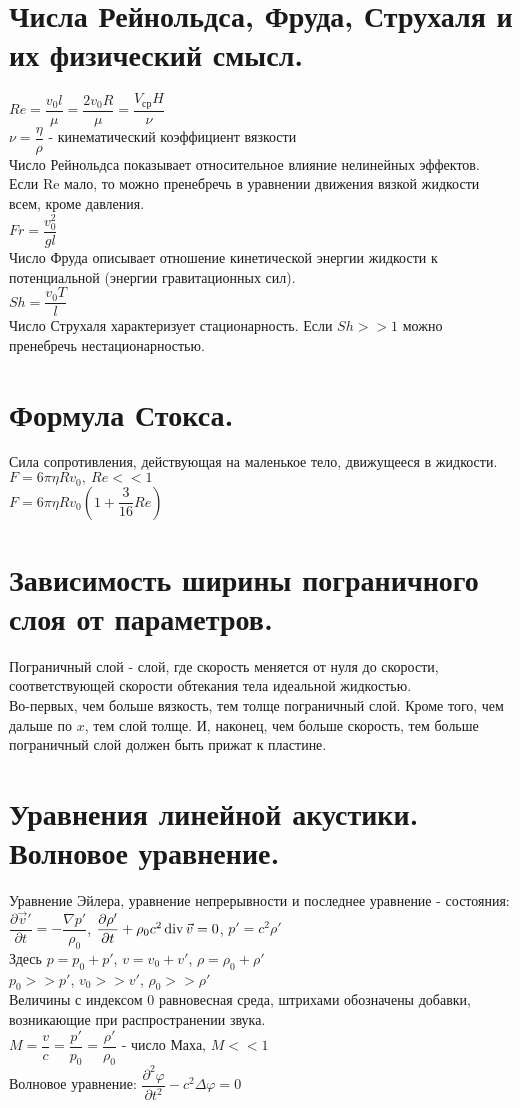 \begin{multicols*}{2}
		\section{Числа Рейнольдса, Фруда, Струхаля и их физический смысл.}
		$Re=\dfrac{v_0l}{\mu}=\dfrac{2v_0R}{\mu} = \dfrac{V_\text{ср}H}{\nu}$\\
		$\nu=\dfrac{\eta}{\rho}$ - кинематический коэффициент вязкости \\
		Число Рейнольдса показывает относительное влияние нелинейных эффектов. Если Re мало, то можно пренебречь в уравнении движения вязкой жидкости всем, кроме давления. \\
		$Fr=\dfrac{v_0^2}{gl}$ \\
		Число Фруда описывает отношение кинетической энергии жидкости к потенциальной (энергии гравитационных сил). \\
		$Sh=\dfrac{v_0T}{l}$ \\
		Число Струхаля характеризует стационарность. Если $Sh >> 1$ можно пренебречь нестационарностью.
		
		\section{Формула Стокса.}
		Сила сопротивления, действующая на маленькое тело, движущееся в жидкости.\\
		$F=6\pi\eta Rv_0, ~Re << 1$ \\
		$F=6\pi\eta Rv_0\left(1+\dfrac{3}{16}Re\right)$
		
		\section{Зависимость ширины пограничного слоя от параметров.}
		Пограничный слой - слой, где скорость меняется от нуля до скорости, соответствующей скорости обтекания тела идеальной жидкостью.\\
		Во-первых, чем больше вязкость, тем толще пограничный слой. Кроме того, чем дальше по $x$, тем слой толще. И, наконец, чем больше скорость, тем больше пограничный слой должен быть прижат к пластине.
		
		\section{Уравнения линейной акустики. Волновое уравнение.}
		Уравнение Эйлера, уравнение непрерывности и последнее уравнение - состояния:\\
		$\dfrac{\partial \vec{v}'}{\partial t} = -\dfrac{\nabla p'}{\rho_0}$,	$\dfrac{\partial \rho'}{\partial t} + \rho_0 c^2 \operatorname{div} \vec{v} = 0$, 	$p' = c^2 \rho'$\\
		Здесь $p = p_0 + p'$, $v = v_0 + v'$, $\rho  = \rho_0 + \rho'$\\
		$p_0 >> p'$, $v_0 >> v'$, $\rho_0 >> \rho'$\\
		Величины с индексом 0 равновесная среда, штрихами обозначены добавки, возникающие при распространении звука.\\
		$M = \dfrac{v}{c} = \dfrac{p'}{p_0} = \dfrac{\rho'}{\rho_0}$ - число Маха, $M << 1$\\
		Волновое уравнение:
		$\dfrac{\partial^2 \varphi}{\partial t^2} - c^2 \Delta\varphi = 0$
		

\end{multicols*}
